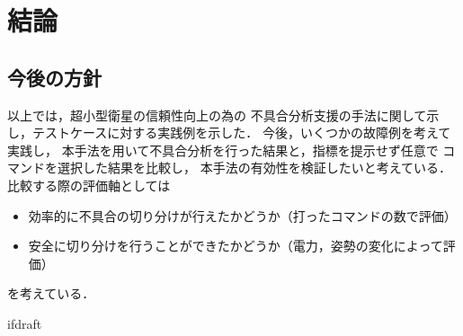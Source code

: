 \documentclass[11pt]{jsreport}
\begin{document}
\fi

\chapter{結論}

\section{今後の方針}
以上では，超小型衛星の信頼性向上の為の
不具合分析支援の手法に関して示し，テストケースに対する実践例を示した．
今後，いくつかの故障例を考えて実践し，
本手法を用いて不具合分析を行った結果と，指標を提示せず任意で
コマンドを選択した結果を比較し，
本手法の有効性を検証したいと考えている．
比較する際の評価軸としては
\begin{itemize}
   \item 効率的に不具合の切り分けが行えたかどうか（打ったコマンドの数で評価）
   \item 安全に切り分けを行うことができたかどうか（電力，姿勢の変化によって評価）
\end{itemize}
を考えている．

\begin{comment}
\section{まとめ}

モデル化に関して
実際の衛星ではコンポーネント数やコマンド・テレメトリの数
が膨大であるためモデルが複雑化し，人によるモデル生成では
ヒューマンエラーや，作業量を考えると非現実的である．
そのため，将来的にはこれらを必要最低限の情報から生成する手法に関しても
検討していく．

また，故障診断のコンテキストによってどこまで掘り下げるべきか使い分けるべきである
\cite{Ontology1998}ことを書く．

一方で，人工衛星は内部のコンポーネントが非常に密集しているおり，人間が設計時に考慮した
意図したつながりだけでなく，意図しないつながりも多く存在する．
このような意図しないつながりによって，波及効果が発生することが衛星内部の理解が
困難になり
\end{comment}

\expandafter\ifx\csname ifdraft\endcsname\relax
  
\end{document}
